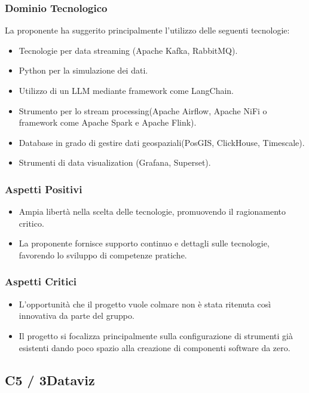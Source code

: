 \documentclass[a4paper, 12pt]{article}
\begin{document}
\subsubsection{Dominio Tecnologico}
La proponente ha suggerito principalmente l’utilizzo delle seguenti tecnologie:
\begin{itemize}
    \item Tecnologie per data streaming (Apache Kafka, RabbitMQ).
    \item Python per la simulazione dei dati.
    \item Utilizzo di un LLM mediante framework come LangChain.
    \item Strumento per lo stream processing(Apache Airflow, Apache NiFi o framework come Apache Spark e Apache Flink).
    \item Database in grado di gestire dati geospaziali(PosGIS, ClickHouse, Timescale).
    \item Strumenti di data visualization (Grafana, Superset).
\end{itemize}

\subsubsection{Aspetti Positivi}
\begin{itemize}
    \item Ampia libertà nella scelta delle tecnologie, promuovendo il ragionamento critico.
    \item La proponente fornisce supporto continuo e dettagli sulle tecnologie, favorendo lo sviluppo di competenze pratiche.
\end{itemize}

\subsubsection{Aspetti Critici}
\begin{itemize}
    \item L’opportunità che il progetto vuole colmare non è stata ritenuta così innovativa da parte del gruppo.
    \item Il progetto si focalizza principalmente sulla configurazione di strumenti già esistenti dando poco spazio alla creazione di componenti software da zero.
\end{itemize}

\subsection{C5 / 3Dataviz}
\end{document}
